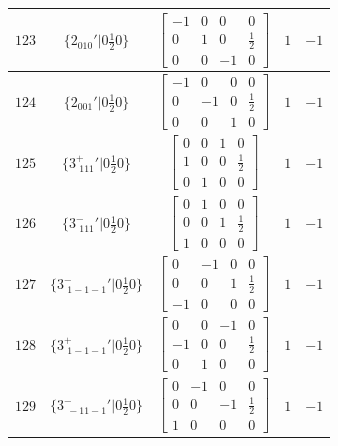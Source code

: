 \documentclass[fleqn,8pt]{jsarticle}
\begin{document}
\begin{longtable}{ccccc}
$ 123 $ & $ \{2{}_{010}{}'|0 \frac{1}{2} 0\} $ & $ \begin{bmatrix} -1 & 0 & 0 & 0 \\ 0 & 1 & 0 & \frac{1}{2} \\ 0 & 0 & -1 & 0 \end{bmatrix} $ & $ 1 $ & $ -1 $ \\ \hline
$ 124 $ & $ \{2{}_{001}{}'|0 \frac{1}{2} 0\} $ & $ \begin{bmatrix} -1 & 0 & 0 & 0 \\ 0 & -1 & 0 & \frac{1}{2} \\ 0 & 0 & 1 & 0 \end{bmatrix} $ & $ 1 $ & $ -1 $ \\ \hline
$ 125 $ & $ \{3^{+}_{\,\,111}{}'|0 \frac{1}{2} 0\} $ & $ \begin{bmatrix} 0 & 0 & 1 & 0 \\ 1 & 0 & 0 & \frac{1}{2} \\ 0 & 1 & 0 & 0 \end{bmatrix} $ & $ 1 $ & $ -1 $ \\ \hline
$ 126 $ & $ \{3^{-}_{\,\,111}{}'|0 \frac{1}{2} 0\} $ & $ \begin{bmatrix} 0 & 1 & 0 & 0 \\ 0 & 0 & 1 & \frac{1}{2} \\ 1 & 0 & 0 & 0 \end{bmatrix} $ & $ 1 $ & $ -1 $ \\ \hline
$ 127 $ & $ \{3^{-}_{\,\,1-1-1}{}'|0 \frac{1}{2} 0\} $ & $ \begin{bmatrix} 0 & -1 & 0 & 0 \\ 0 & 0 & 1 & \frac{1}{2} \\ -1 & 0 & 0 & 0 \end{bmatrix} $ & $ 1 $ & $ -1 $ \\ \hline
$ 128 $ & $ \{3^{+}_{\,\,1-1-1}{}'|0 \frac{1}{2} 0\} $ & $ \begin{bmatrix} 0 & 0 & -1 & 0 \\ -1 & 0 & 0 & \frac{1}{2} \\ 0 & 1 & 0 & 0 \end{bmatrix} $ & $ 1 $ & $ -1 $ \\ \hline
$ 129 $ & $ \{3^{-}_{\,\,-11-1}{}'|0 \frac{1}{2} 0\} $ & $ \begin{bmatrix} 0 & -1 & 0 & 0 \\ 0 & 0 & -1 & \frac{1}{2} \\ 1 & 0 & 0 & 0 \end{bmatrix} $ & $ 1 $ & $ -1 $ \\ \hline

\end{longtable}
\end{document}
